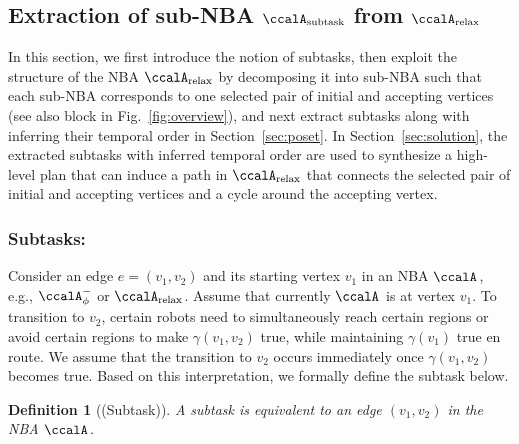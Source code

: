 \documentclass[Afour,sageh,times]{sagej}
\newcommand*\circled[1]{\tikz[baseline=(char.base)]{
            \node[shape=circle,draw,inner sep=1pt] (char) {#1};}}
\newtheorem{defn}[thm]{Definition}
\newcommand{\auto}[1]{\ccalA_{\textup{#1}}}
\newcommand{\autop}{\ccalA_{\phi}}
\newcommand{\node}[1]{V_{n}^{\text{#1}}}
\begin{document}
{  \subsection{Extraction of sub-NBA \upshape  $\auto{subtask}$  from $\auto{relax}$}\label{sec:pregraph}
  In this section, we first introduce the notion of subtasks, then exploit the structure of the NBA $\auto{relax}$ by decomposing it into sub-NBA such that each sub-NBA corresponds to one selected pair of initial and accepting vertices (see also block \circled{1} in Fig.~\ref{fig:overview}), and next extract subtasks along with inferring their temporal order in  Section~\ref{sec:poset}. In Section~\ref{sec:solution}, the extracted subtasks with inferred temporal order are used to synthesize a high-level plan that can induce a path in $\auto{relax}$ that connects the selected pair of initial and accepting vertices and a cycle around the accepting vertex.
\subsubsection{Subtasks:}\label{sec:subtask}
Consider an edge $e = (v_1, v_2) $  and its starting vertex $v_1$ in an NBA $\auto{}$, e.g., $\autop^-$ or $\auto{relax}$.  Assume that  currently  $\auto{}$ is at vertex $v_1$. To transition to $v_2$, certain robots need to simultaneously reach certain regions  or avoid certain regions to make $\gamma(v_1, v_2)$ true, while maintaining  $\gamma(v_1)$ true en route. We assume that the transition to $v_2$ occurs immediately once $\gamma(v_1, v_2)$ becomes true. Based on this interpretation, we formally define the subtask below.
\begin{defn}[(Subtask)]\label{defn:subtask}
 {A subtask is equivalent to an edge $(v_1, v_2)$ in the NBA $\auto{}$.}
\end{defn}

}
\end{document}
